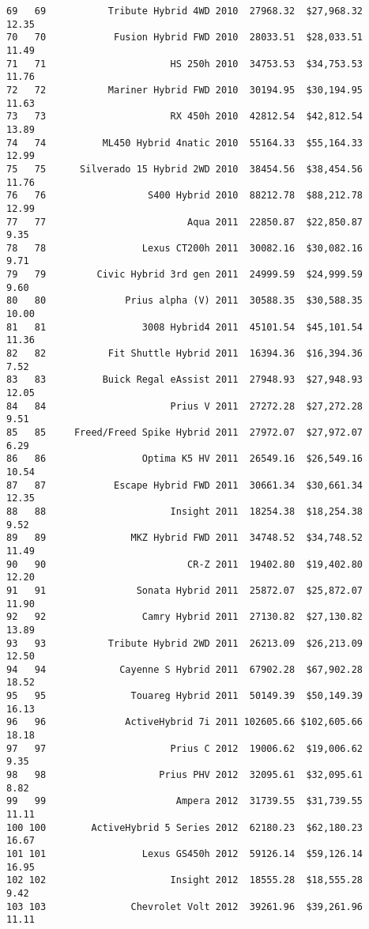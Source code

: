 \documentclass[
  letterpaper,
  DIV=11,
  numbers=noendperiod]{scrreprt}
\begin{document}
\begin{verbatim}
69   69           Tribute Hybrid 4WD 2010  27968.32  $27,968.32       12.35
70   70            Fusion Hybrid FWD 2010  28033.51  $28,033.51       11.49
71   71                      HS 250h 2010  34753.53  $34,753.53       11.76
72   72           Mariner Hybrid FWD 2010  30194.95  $30,194.95       11.63
73   73                      RX 450h 2010  42812.54  $42,812.54       13.89
74   74          ML450 Hybrid 4natic 2010  55164.33  $55,164.33       12.99
75   75      Silverado 15 Hybrid 2WD 2010  38454.56  $38,454.56       11.76
76   76                  S400 Hybrid 2010  88212.78  $88,212.78       12.99
77   77                         Aqua 2011  22850.87  $22,850.87        9.35
78   78                 Lexus CT200h 2011  30082.16  $30,082.16        9.71
79   79         Civic Hybrid 3rd gen 2011  24999.59  $24,999.59        9.60
80   80              Prius alpha (V) 2011  30588.35  $30,588.35       10.00
81   81                 3008 Hybrid4 2011  45101.54  $45,101.54       11.36
82   82           Fit Shuttle Hybrid 2011  16394.36  $16,394.36        7.52
83   83          Buick Regal eAssist 2011  27948.93  $27,948.93       12.05
84   84                      Prius V 2011  27272.28  $27,272.28        9.51
85   85     Freed/Freed Spike Hybrid 2011  27972.07  $27,972.07        6.29
86   86                 Optima K5 HV 2011  26549.16  $26,549.16       10.54
87   87            Escape Hybrid FWD 2011  30661.34  $30,661.34       12.35
88   88                      Insight 2011  18254.38  $18,254.38        9.52
89   89               MKZ Hybrid FWD 2011  34748.52  $34,748.52       11.49
90   90                         CR-Z 2011  19402.80  $19,402.80       12.20
91   91                Sonata Hybrid 2011  25872.07  $25,872.07       11.90
92   92                 Camry Hybrid 2011  27130.82  $27,130.82       13.89
93   93           Tribute Hybrid 2WD 2011  26213.09  $26,213.09       12.50
94   94             Cayenne S Hybrid 2011  67902.28  $67,902.28       18.52
95   95               Touareg Hybrid 2011  50149.39  $50,149.39       16.13
96   96              ActiveHybrid 7i 2011 102605.66 $102,605.66       18.18
97   97                      Prius C 2012  19006.62  $19,006.62        9.35
98   98                    Prius PHV 2012  32095.61  $32,095.61        8.82
99   99                       Ampera 2012  31739.55  $31,739.55       11.11
100 100        ActiveHybrid 5 Series 2012  62180.23  $62,180.23       16.67
101 101                 Lexus GS450h 2012  59126.14  $59,126.14       16.95
102 102                      Insight 2012  18555.28  $18,555.28        9.42
103 103               Chevrolet Volt 2012  39261.96  $39,261.96       11.11

\end{verbatim}
\end{document}
